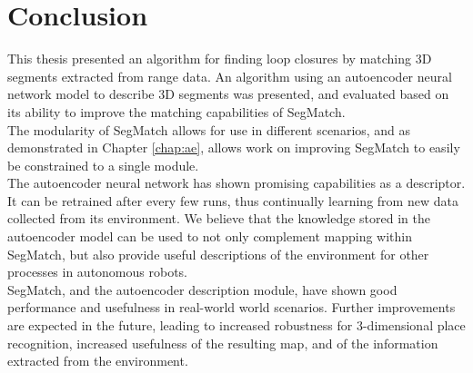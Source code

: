\chapter{Conclusion}
\label{chap:conclusion}

This thesis presented an algorithm for finding loop closures by matching 3D segments extracted from range data. An algorithm using an autoencoder neural network model to describe 3D segments was presented, and evaluated based on its ability to improve the matching capabilities of SegMatch.\\

The modularity of SegMatch allows for use in different scenarios, and as demonstrated in Chapter \ref{chap:ae}, allows work on improving SegMatch to easily be constrained to a single module.\\

The autoencoder neural network has shown promising capabilities as a descriptor. It can be retrained after every few runs, thus continually learning from new data collected from its environment. We believe that the knowledge stored in the autoencoder model can be used to not only complement mapping within SegMatch, but also provide useful descriptions of the environment for other processes in autonomous robots.\\

SegMatch, and the autoencoder description module, have shown good performance and usefulness in real-world world scenarios. Further improvements are expected in the future, leading to increased robustness for 3-dimensional place recognition, increased usefulness of the resulting map, and of the information extracted from the environment.

